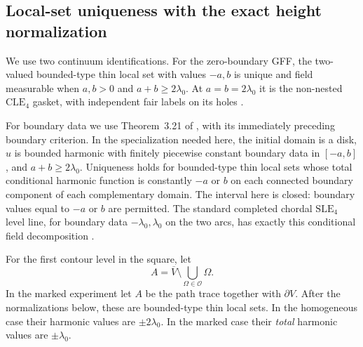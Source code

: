\subsection{Local-set uniqueness with the exact height normalization}

We use two continuum identifications.  For the zero-boundary GFF,
the two-valued bounded-type thin local set with values $-a,b$ is
unique and field measurable when $a,b>0$ and
$a+b\geq2\lambda_0$.  At $a=b=2\lambda_0$ it is the non-nested
$\mathrm{CLE}_4$ gasket, with independent fair labels on its
holes \citep[Propositions~1 and~2 and Sections~4 and~6.3]
{AruSepulvedaWerner2019}.

For boundary data we use Theorem~3.21 of
\citet{AruLupuSepulveda2020}, with its immediately preceding
boundary criterion.  In the specialization needed here, the
initial domain is a disk, $u$ is bounded harmonic with finitely
piecewise constant boundary data in $[-a,b]$, and
$a+b\geq2\lambda_0$.  Uniqueness holds for bounded-type thin
local sets whose total conditional harmonic function is
constantly $-a$ or $b$ on each connected boundary component
of each complementary domain.  The interval here is closed:
boundary values equal to $-a$ or $b$ are permitted.  The
standard completed chordal $\mathrm{SLE}_4$ level line, for
boundary data $-\lambda_0,\lambda_0$ on the two arcs, has
exactly this conditional field decomposition
\citep{SchrammSheffield2013}.

\begin{lemma}
\label{q4pocket:local-set}
For the first contour level in the square, let
\[
 A=\overline V\setminus\bigcup_{\Omega\in\mathcal O}\Omega.
\]
In the marked experiment let $A$ be the path trace together with
$\partial V$.  After the normalizations below, these are
bounded-type thin local sets.  In the homogeneous case their
harmonic values are $\pm2\lambda_0$.  In the marked case their
\emph{total} harmonic values are $\pm\lambda_0$.
\end{lemma}

